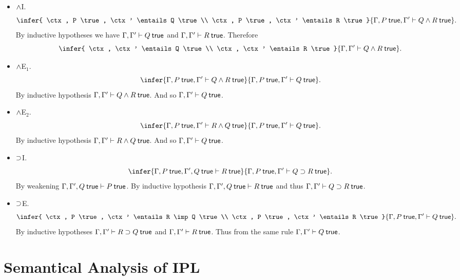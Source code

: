 \documentclass[12pt]{article}
\newenvironment{sol}{\trivlist \item[\hskip \labelsep{\bf
Solution:}]}{\endtrivlist}
\begin{document}
{\begin{sol}
\begin{itemize}
    \item $\wedge$I.
      \[
        \infer{
          \ctx, P \true, \ctx' \entails Q \true
          \\
          \ctx, P \true, \ctx' \entails R \true
        }{
          \ctx, P \true, \ctx' \entails Q \meet R \true
        }.
      \]
      By inductive hypotheses we have
      $\ctx, \ctx' \entails Q \true$
      and
      $\ctx, \ctx' \entails R \true$.
      Therefore
      \[
        \infer{
          \ctx, \ctx' \entails Q \true
          \\
          \ctx, \ctx' \entails R \true
        }{
          \ctx, \ctx' \entails Q \meet R \true
        }.
      \]
    \item $\wedge$E$_1$.
      \[
        \infer{
          \ctx, P \true, \ctx' \entails Q \meet R \true
        }{
          \ctx, P \true, \ctx' \entails Q \true
        }.
      \]
      By inductive hypothesis $\ctx, \ctx' \entails Q \meet R \true$.
      And so $\ctx, \ctx' \entails Q \true$.
    \item $\wedge$E$_2$.
      \[
        \infer{
          \ctx, P \true, \ctx' \entails R \meet Q \true
        }{
          \ctx, P \true, \ctx' \entails Q \true
        }.
      \]
      By inductive hypothesis $\ctx, \ctx' \entails R \meet Q \true$.
      And so $\ctx, \ctx' \entails Q \true$.
    \item $\supset$I.
      \[
        \infer{
          \ctx, P \true, \ctx', Q \true \entails R \true
        }{
          \ctx, P \true, \ctx' \entails Q \imp R \true
        }.
      \]
      By weakening $\ctx, \ctx', Q \true \entails P \true$.
      By inductive hypothesis $\ctx, \ctx', Q \true \entails R \true$
      and thus $\ctx, \ctx' \entails Q \imp R \true$.
    \item $\supset$E.
      \[
        \infer{
          \ctx, P \true, \ctx' \entails R \imp Q \true
          \\
          \ctx, P \true, \ctx' \entails R \true
        }{
          \ctx, P \true, \ctx' \entails Q \true
        }.
      \]
      By inductive hypotheses
      $\ctx, \ctx' \entails R \imp Q \true$
      and
      $\ctx, \ctx' \entails R \true$.
      Thus from the same rule
      $\ctx, \ctx' \entails Q \true$.
  \end{itemize}
\end{sol}
}

\section{Semantical Analysis of IPL}
\end{document}
